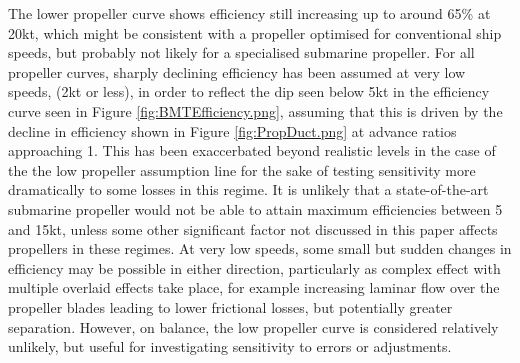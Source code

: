 \documentclass{article}\usepackage[]{graphicx}\usepackage[]{color}
\begin{document}
The lower propeller curve shows efficiency still increasing up to around 65\% at 20kt, which might be consistent with a propeller optimised for conventional ship speeds, but probably not likely for a specialised submarine propeller.  For all propeller curves, sharply declining efficiency has been assumed at very low speeds, (2kt or less), in order to reflect the dip seen below 5kt in the efficiency curve seen in Figure \ref{fig:BMTEfficiency.png}, assuming that this is driven by the decline in efficiency shown in Figure \ref{fig:PropDuct.png} at advance ratios approaching 1.  This has been exaccerbated beyond realistic levels in the case of the the low propeller assumption line for the sake of testing sensitivity more dramatically to some losses in this regime.  It is unlikely that a state-of-the-art submarine propeller would not be able to attain maximum efficiencies between 5 and 15kt, unless some other significant factor not discussed in this paper affects propellers in these regimes. At very low speeds, some small but sudden changes in efficiency may be possible in either direction, particularly as complex effect with multiple overlaid effects take place, for example increasing laminar flow over the propeller blades leading to lower frictional losses, but potentially greater separation.  However, on balance, the low propeller curve is considered relatively unlikely, but useful for investigating sensitivity to errors or adjustments.
\end{document}
